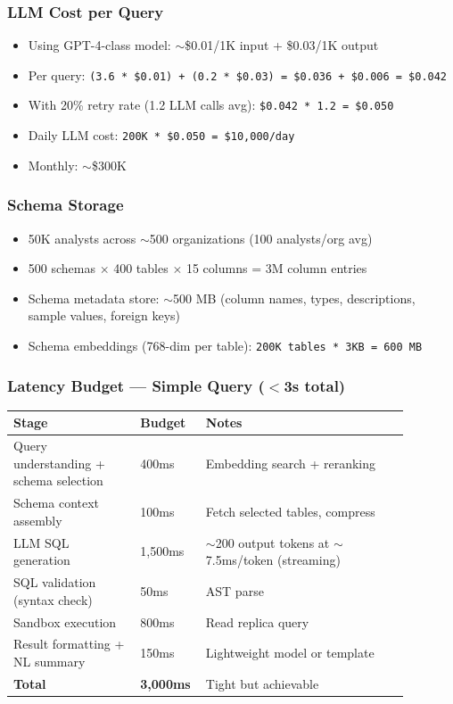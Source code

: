 \subsubsection*{LLM Cost per Query}

\begin{itemize}
  \item Using GPT-4-class model: $\sim$\$0.01/1K input + \$0.03/1K output
  \item Per query: \texttt{(3.6 * \$0.01) + (0.2 * \$0.03) = \$0.036 + \$0.006 = \$0.042}
  \item With 20\% retry rate (1.2 LLM calls avg): \texttt{\$0.042 * 1.2 = \$0.050}
  \item Daily LLM cost: \texttt{200K * \$0.050 = \$10,000/day}
  \item Monthly: $\sim$\$300K
\end{itemize}

\subsubsection*{Schema Storage}

\begin{itemize}
  \item 50K analysts across $\sim$500 organizations (100 analysts/org avg)
  \item 500 schemas $\times$ 400 tables $\times$ 15 columns = 3M column entries
  \item Schema metadata store: $\sim$500 MB (column names, types, descriptions, sample values, foreign keys)
  \item Schema embeddings (768-dim per table): \texttt{200K tables * 3KB = 600 MB}
\end{itemize}

\subsubsection*{Latency Budget --- Simple Query ($<$3s total)}

\begin{tabular}{|p{0.30\linewidth}|p{0.10\linewidth}|p{0.48\linewidth}|}
\hline
\textbf{Stage} & \textbf{Budget} & \textbf{Notes} \\
\hline
Query understanding + schema selection & 400ms & Embedding search + reranking \\
\hline
Schema context assembly & 100ms & Fetch selected tables, compress \\
\hline
LLM SQL generation & 1,500ms & $\sim$200 output tokens at $\sim$7.5ms/token (streaming) \\
\hline
SQL validation (syntax check) & 50ms & AST parse \\
\hline
Sandbox execution & 800ms & Read replica query \\
\hline
Result formatting + NL summary & 150ms & Lightweight model or template \\
\hline
\textbf{Total} & \textbf{3,000ms} & Tight but achievable \\
\hline
\end{tabular}

